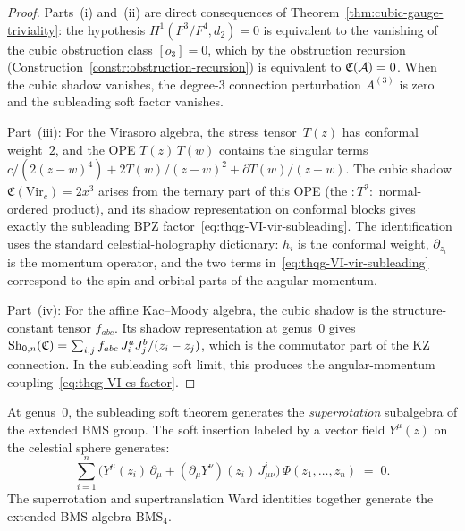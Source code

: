\begin{proof}
Parts~(i) and~(ii) are direct consequences of
Theorem~\ref{thm:cubic-gauge-triviality}: the hypothesis
$H^1(F^3/F^4, d_2) = 0$ is equivalent to the vanishing of the
cubic obstruction class $[o_3] = 0$, which by the obstruction
recursion
(Construction~\ref{constr:obstruction-recursion})
is equivalent to $\mathfrak{C}(\mathcal{A}) = 0$. When the cubic shadow
vanishes, the degree-$3$ connection perturbation $A^{(3)}$ is zero
and the subleading soft factor vanishes.

Part~(iii): For the Virasoro algebra, the stress tensor~$T(z)$
has conformal weight~$2$, and the OPE $T(z)\,T(w)$ contains the
singular terms $c/(2(z-w)^4) + 2T(w)/(z-w)^2 + \partial T(w)/(z-w)$.
The cubic shadow $\mathfrak{C}(\mathrm{Vir}_c) = 2x^3$ arises
from the ternary part of this OPE (the $:T^2:$ normal-ordered
product), and its shadow representation on conformal blocks gives
exactly the subleading BPZ factor~\eqref{eq:thqg-VI-vir-subleading}.
The identification uses the standard celestial-holography dictionary:
$h_i$ is the conformal weight, $\partial_{z_i}$ is the momentum
operator, and the two terms in~\eqref{eq:thqg-VI-vir-subleading}
correspond to the spin and orbital parts of the angular momentum.

Part~(iv): For the affine Kac--Moody algebra, the cubic shadow
is the structure-constant tensor $f_{abc}$. Its shadow
representation at genus~$0$ gives
$\operatorname{Sh}_{0,n}(\mathfrak{C}) = \sum_{i,j} f_{abc}\,J^a_i J^b_j
/(z_i - z_j)$,
which is the commutator part of the KZ connection. In the
subleading soft limit, this produces the angular-momentum
coupling~\eqref{eq:thqg-VI-cs-factor}.
\end{proof}

\begin{corollary}
\label{cor:thqg-VI-superrotation}
At genus~$0$, the subleading soft theorem generates the
\emph{superrotation} subalgebra of the extended BMS group.
The soft insertion labeled by a vector field $Y^\mu(z)$ on the
celestial sphere generates:
\begin{equation}\label{eq:thqg-VI-superrotation}
\sum_{i=1}^{n}
\bigl(Y^\mu(z_i)\,\partial_\mu
+ (\partial_\mu Y^\nu)(z_i)\,J^i_{\mu\nu}\bigr)\,
\Phi(z_1, \dotsc, z_n)
\;=\; 0.
\end{equation}
The superrotation and supertranslation Ward identities together
generate the extended BMS algebra $\mathrm{BMS}_4$.
\end{corollary}

